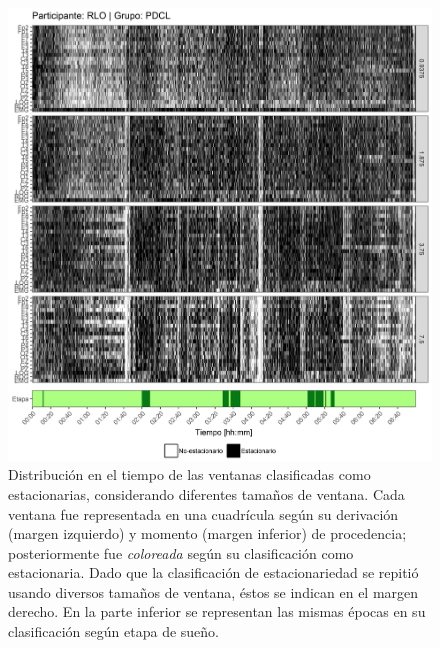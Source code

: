 \documentclass[12pt,letterpaper,draft]{book}
\begin{document}
\begin{figure}
\centering
\includegraphics[width=\linewidth]
{./scripts_graf_res/RLO_patrones_1.png}
\caption[Distribución en el tiempo de las ventanas clasificadas como estacionarias, considerando diferentes tamaños de ventana]{Distribución en el tiempo de las ventanas clasificadas como estacionarias, considerando diferentes tamaños de ventana. 
Cada ventana fue representada en una cuadrícula según su derivación (margen izquierdo) y momento (margen inferior) de procedencia; posteriormente fue \textit{coloreada} según su clasificación como estacionaria.
Dado que la clasificación de estacionariedad se repitió usando diversos tamaños de ventana, éstos se indican en el margen derecho.
En la parte inferior se representan las mismas épocas en su clasificación según etapa de sueño.}
\end{figure}
\end{document}
